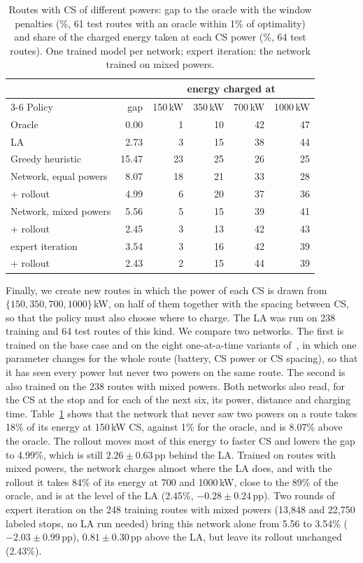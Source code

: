 \documentclass[runningheads]{llncs}
\begin{document}
\begin{table}[t]
\caption{Routes with CS of different powers: gap to the oracle with the window
penalties (\%, 61 test routes with an oracle within 1\% of optimality) and
share of the charged energy taken at each CS power (\%, 64 test routes). One
trained model per network; expert iteration: the network trained on mixed
powers.}
\label{tab:other}
\centering\small
\setlength{\tabcolsep}{4pt}
\begin{tabular}{@{}lrrrrr@{}}
\toprule
 & & \multicolumn{4}{c}{energy charged at}\\
\cmidrule(l){3-6}
Policy & gap & 150\,kW & 350\,kW & 700\,kW & 1000\,kW\\
\midrule
Oracle & 0.00 & 1 & 10 & 42 & 47\\
LA & 2.73 & 3 & 15 & 38 & 44\\
Greedy heuristic~\cite{pagnier2026scheduling} & 15.47 & 23 & 25 & 26 & 25\\
\midrule
Network, equal powers & 8.07 & 18 & 21 & 33 & 28\\
\quad + rollout & 4.99 & 6 & 20 & 37 & 36\\
Network, mixed powers & 5.56 & 5 & 15 & 39 & 41\\
\quad + rollout & 2.45 & 3 & 13 & 42 & 43\\
\quad expert iteration & 3.54 & 3 & 16 & 42 & 39\\
\quad\quad + rollout & 2.43 & 2 & 15 & 44 & 39\\
\bottomrule
\end{tabular}
\end{table}

Finally, we create new routes in which the power of each CS is drawn from
$\{150,350,700,1000\}$\,kW, on half of them together with the spacing between
CS, so that the policy must also choose where to charge. The LA was run on 238
training and 64 test routes of this kind. We compare two networks. The first
is trained on the base case and on the eight one-at-a-time variants
of~\cite{pagnier2026scheduling}, in which one parameter changes for the whole
route (battery, CS power or CS spacing), so that it has seen every power but
never two powers on the same route. The second is also trained on the 238 routes with mixed powers. Both networks
also read, for the CS at the stop and for each of the next six, its power,
distance and charging time. Table~\ref{tab:other} shows that the network that
never saw two powers on a route takes 18\% of its energy at 150\,kW CS,
against 1\% for the oracle, and is 8.07\% above the oracle. The rollout moves
most of this energy to faster CS and lowers the gap to 4.99\%, which is still
$2.26\pm0.63$\,pp behind the LA. Trained on routes with mixed powers, the
network charges almost where the LA does, and with the rollout it takes 84\%
of its energy at 700 and 1000\,kW, close to the 89\% of the oracle, and is at
the level of the LA (2.45\%, $-0.28\pm0.24$\,pp). Two rounds of expert
iteration on the 248 training routes with mixed powers (13{,}848 and 22{,}750
labeled stops, no LA run needed) bring this network alone from 5.56 to 3.54\%
($-2.03\pm0.99$\,pp), $0.81\pm0.30$\,pp above the LA, but leave its rollout
unchanged (2.43\%).
\end{document}
